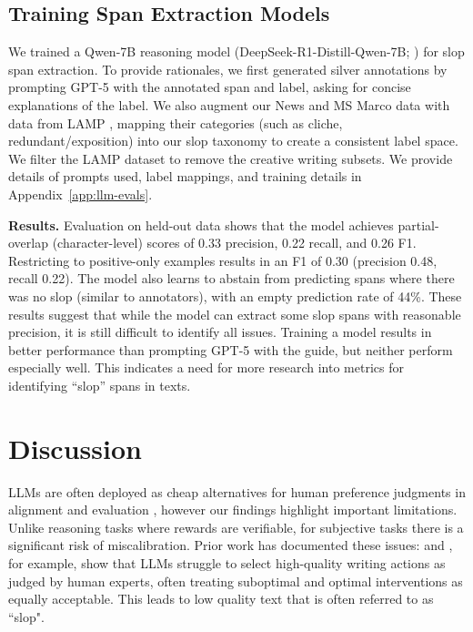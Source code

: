 \documentclass{article} %
\begin{document}
\subsection{Training Span Extraction Models}
We trained a Qwen-7B reasoning model (DeepSeek-R1-Distill-Qwen-7B; \citealt{deepseekai2025deepseekr1incentivizingreasoningcapability}) for slop span extraction. To provide rationales, we first generated silver annotations by prompting GPT-5 with the annotated span and label, asking for concise explanations of the label. We  also augment our News and MS Marco data with data from LAMP \cite{chakrabarty2025ai,chakrabarty2025can}, mapping their categories (such as cliche, redundant/exposition) into our slop taxonomy to create a consistent label space. We filter the LAMP dataset to remove the creative writing subsets. We provide details of prompts used, label mappings, and training details in Appendix~\ref{app:llm-evals}.

\textbf{Results.}
Evaluation on held-out data shows that the model achieves partial-overlap (character-level) scores of 0.33 precision, 0.22 recall, and 0.26 F1. Restricting to positive-only examples results in an F1 of 0.30 (precision 0.48, recall 0.22). The model also learns to abstain from predicting spans where there was no slop (similar to annotators), with an empty prediction rate of 44\%. These results suggest that while the model can extract some slop spans with reasonable precision, it is still difficult to identify all issues.
Training a model results in better performance than prompting GPT-5 with the guide, but neither perform especially well. 
This indicates a need for more research into metrics for identifying ``slop'' spans in texts. 


\section{Discussion}
LLMs are often deployed as 
cheap alternatives for human preference judgments in alignment and evaluation \citep{bharadwaj2025flattery}, however
our findings highlight important limitations. 
Unlike reasoning tasks where rewards are verifiable, for subjective tasks there is a significant risk of miscalibration. Prior work has documented these issues:  \cite{chakrabarty2025ai} and \cite{Gooding2025WritingAA}, for example, show that LLMs struggle to select high-quality writing actions as judged by human experts, often treating suboptimal and optimal interventions as equally acceptable. 
This leads to low quality text that is often referred to as ``slop". 
\end{document}
